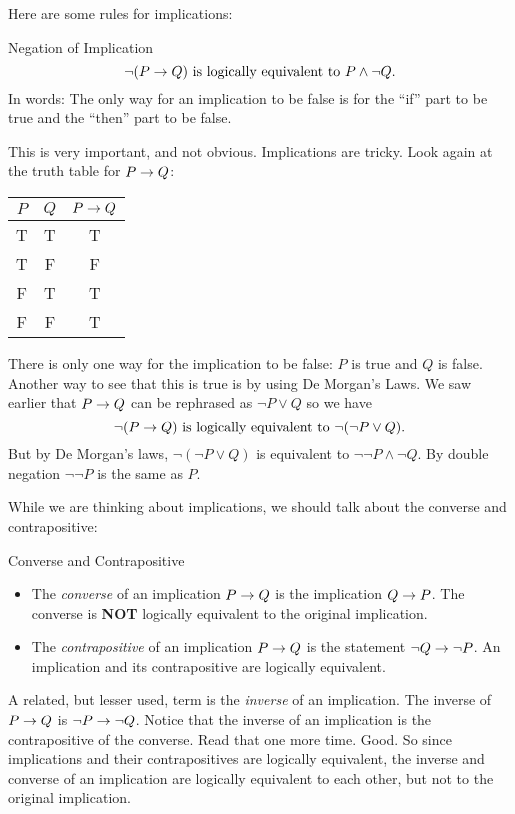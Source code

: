 \documentclass[12pt]{article}
\begin{document}
Here are some rules for implications:

\begin{defbox}{Negation of Implication}
  \[\neg(P \rightarrow Q) \mbox{ is logically equivalent to } P \wedge \neg Q.\]
  In words: The only way for an implication to be false is for the ``if'' part to be true and the ``then'' part to be false.
\end{defbox}

This is very important, and not obvious. Implications are tricky.  Look again at the truth table for $P \rightarrow Q$:

\begin{center}
\begin{tabular}{c|c|c}
 $P$ & $Q$ & $P\rightarrow Q$ \\ \hline
 T & T & T\\
 T & F & F\\
 F & T & T\\
 F & F & T
\end{tabular}
\end{center}

There is only one way for the implication to be false: $P$ is true and $Q$ is false.  Another way to see that this is true is by using De Morgan's Laws.  We saw earlier that $P \rightarrow Q$ can be rephrased as $\neg P \vee Q$ so we have
\[\neg (P \rightarrow Q) \mbox{ is logically equivalent to } \neg( \neg P \vee Q).\]
But by De Morgan's laws, $\neg( \neg P \vee Q)$ is equivalent to $\neg \neg P \wedge \neg Q$.  By double negation $\neg \neg P$ is the same as $P$.

While we are thinking about implications, we should talk about the converse and contrapositive:

\begin{defbox}{Converse and Contrapositive}
  \begin{itemize}
    \item The {\em converse} of an implication $P \rightarrow Q$ is the implication $Q \rightarrow P$.  The converse is \textbf{NOT} logically equivalent to the original implication.
    \item The {\em contrapositive} of an implication $P \rightarrow Q$ is the statement $\neg Q \rightarrow \neg P$.  An implication and its contrapositive are logically equivalent.
  \end{itemize}

\end{defbox}

A related, but lesser used, term is the {\em inverse} of an implication.  The inverse of $P \rightarrow Q$ is $\neg P \rightarrow \neg Q$.  Notice that the inverse of an implication is the contrapositive of the converse.  Read that one more time.   Good.  So since implications and their contrapositives are logically equivalent, the inverse and converse of an implication are logically equivalent to each other, but not to the original implication.
\end{document}
